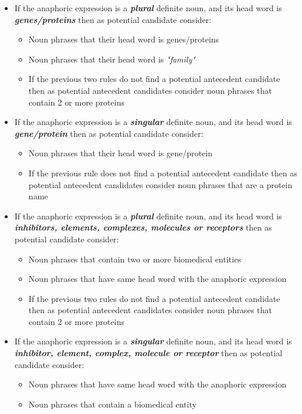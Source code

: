 \begin{itemize}
	\item If the anaphoric expression is a \emph{\textbf{plural}} definite noun, and its head word is \emph{\textbf{genes/proteins}} then as potential candidate consider:
	\begin{itemize}
		\item Noun phrases that their head word is genes/proteins 
		\item Noun phrases that their head word is \emph{"family"}
		\item If the previous two rules do not find a potential antecedent candidate then as potential antecedent candidates consider noun phrases that contain 2 or more proteins 
	\end{itemize}
	\item If the anaphoric expression is a \emph{\textbf{singular}} definite noun, and its head word is \emph{\textbf{gene/protein}} then as potential candidate consider:
	\begin{itemize}
		\item Noun phrases that their head word is gene/protein
		\item If the previous rule does not find a potential antecedent candidate then as potential antecedent candidates consider noun phrases that are a protein name 
	\end{itemize}
	\item If the anaphoric expression is a \emph{\textbf{plural}} definite noun, and its head word is \emph{\textbf{inhibitors, elements, complexes, molecules or receptors }} then as potential candidate consider:
	\begin{itemize}
		\item Noun phrases that contain two or more biomedical entities
		\item Noun phrases that have same head word with the anaphoric expression
		\item If the previous two rules do not find a potential antecedent candidate then as potential antecedent candidates consider noun phrases that contain 2 or more proteins 
	\end{itemize}
	\item If the anaphoric expression is a \emph{\textbf{singular}} definite noun, and its head word is \emph{\textbf{inhibitor, element, complex, molecule or receptor }} then as potential candidate consider:
	\begin{itemize}
		\item Noun phrases that have same head word with the anaphoric expression
		\item Noun phrases that contain a biomedical entity
	\end{itemize}
\end{itemize}

